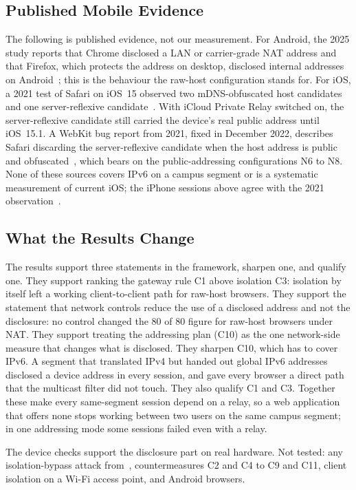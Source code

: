 \documentclass[conference]{IEEEtran}
\begin{document}
\subsection{Published Mobile Evidence}
\label{sec:mobile}
The following is published evidence, not our measurement. For Android, the 2025 study reports that Chrome disclosed a LAN or carrier-grade NAT address and that Firefox, which protects the address on desktop, disclosed internal addresses on Android~\cite{koysha2025}; this is the behaviour the raw-host configuration stands for. For iOS, a 2021 test of Safari on iOS~15 observed two mDNS-obfuscated host candidates and one server-reflexive candidate~\cite{hancke2021}. With iCloud Private Relay switched on, the server-reflexive candidate still carried the device's real public address until iOS~15.1. A WebKit bug report from 2021, fixed in December 2022, describes Safari discarding the server-reflexive candidate when the host address is public and obfuscated~\cite{webkit233414}, which bears on the public-addressing configurations N6 to N8. None of these sources covers IPv6 on a campus segment or is a systematic measurement of current iOS; the iPhone sessions above agree with the 2021 observation~\cite{hancke2021}.

\subsection{What the Results Change}
The results support three statements in the framework, sharpen one, and qualify one. They support ranking the gateway rule C1 above isolation C3: isolation by itself left a working client-to-client path for raw-host browsers. They support the statement that network controls reduce the use of a disclosed address and not the disclosure: no control changed the 80 of 80 figure for raw-host browsers under NAT. They support treating the addressing plan (C10) as the one network-side measure that changes what is disclosed. They sharpen C10, which has to cover IPv6. A segment that translated IPv4 but handed out global IPv6 addresses disclosed a device address in every session, and gave every browser a direct path that the multicast filter did not touch. They also qualify C1 and C3. Together these make every same-segment session depend on a relay, so a web application that offers none stops working between two users on the same campus segment; in one addressing mode some sessions failed even with a relay.

The device checks support the disclosure part on real hardware. Not tested: any isolation-bypass attack from~\cite{framingframes2023,airsnitch2026}, countermeasures C2 and C4 to C9 and C11, client isolation on a Wi-Fi access point, and Android browsers.
\end{document}
